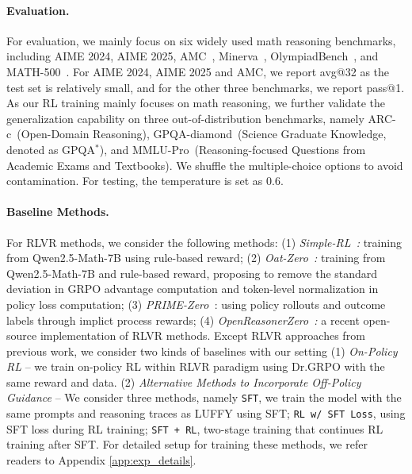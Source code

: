 \documentclass{article}
\newcommand{\m}[1]{\texttt{#1}}
\begin{document}
\paragraph{Evaluation.}
For evaluation, we mainly focus on six widely used math reasoning benchmarks, including AIME 2024, AIME 2025, AMC~\cite{li2024numinamath}, Minerva~\cite{dataset_minerva}, OlympiadBench~\cite{dataset_olympiad}, and MATH-500~\cite{dataset_math}. 
For AIME 2024, AIME 2025 and AMC, we report avg@32 as the test set is relatively small, and for the other three benchmarks, we report pass@1.
As our RL training mainly focuses on math reasoning, we further validate the generalization capability on three out-of-distribution benchmarks, namely ARC-c~\cite{arc}(Open-Domain Reasoning), GPQA-diamond~\cite{gpqa}(Science Graduate Knowledge, denoted as GPQA$^{*}$), and MMLU-Pro~\cite{mmlu_pro}(Reasoning-focused Questions from Academic Exams and Textbooks). 
We shuffle the multiple-choice options to avoid contamination. 
For testing, the temperature is set as 0.6. 





\vspace{-0.5\baselineskip}
\paragraph{Baseline Methods.}
For RLVR methods, we consider the following methods: (1) \textit{Simple-RL~\cite{simplerl}:} training from Qwen2.5-Math-7B using rule-based reward; (2) \textit{Oat-Zero~\cite{drgrpo}:} training from Qwen2.5-Math-7B and rule-based reward, proposing to remove the standard deviation in GRPO advantage computation and token-level normalization in policy loss computation;  (3) \textit{PRIME-Zero~\cite{prime}}: using policy rollouts and outcome labels through implict process rewards; (4) \textit{OpenReasonerZero~\cite{orz}: } a recent open-source implementation of RLVR methods.
Except RLVR approaches from previous work, we consider two kinds of baselines with our setting (1) \textit{On-Policy RL} -- we train on-policy RL within RLVR paradigm using Dr.GRPO with the same reward and data. (2) \textit{Alternative Methods to Incorporate Off-Policy Guidance} -- We consider three methods, namely \m{SFT}, 
we train the model with the same prompts and reasoning traces as LUFFY using SFT; \m{RL w/ SFT Loss}, using SFT loss during RL training; \m{SFT + RL}, two-stage training that continues RL training after SFT. For detailed setup for training these methods, we refer readers to Appendix \ref{app:exp_details}.
\end{document}
